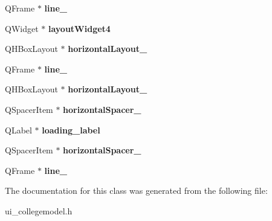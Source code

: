 \begin{DoxyCompactItemize}
Q\+Frame $\ast$ {\bfseries line\+\_}
\item 
\mbox{\label{class_ui___college_model_a1dc907e4b7248cc743c968dc1e61148c}} 
Q\+Widget $\ast$ {\bfseries layout\+Widget4}
\item 
\mbox{\label{class_ui___college_model_adbfb72e4580306a4877230ce3edb7098}} 
Q\+H\+Box\+Layout $\ast$ {\bfseries horizontal\+Layout\+\_}
\item 
\mbox{\label{class_ui___college_model_a3cba7f7dfe5b984ab0a7a38b6884cd55}} 
Q\+Frame $\ast$ {\bfseries line\+\_}
\item 
\mbox{\label{class_ui___college_model_afafb10cd25d6e9f4350677130193512b}} 
Q\+H\+Box\+Layout $\ast$ {\bfseries horizontal\+Layout\+\_}
\item 
\mbox{\label{class_ui___college_model_a4a6598ce1fd4560615ca94872dbc7f3c}} 
Q\+Spacer\+Item $\ast$ {\bfseries horizontal\+Spacer\+\_}
\item 
\mbox{\label{class_ui___college_model_a61047000346207cced67e38e1d94603f}} 
Q\+Label $\ast$ {\bfseries loading\+\_\+label}
\item 
\mbox{\label{class_ui___college_model_afa37370f8db338cac2ee6ca71c3cffdc}} 
Q\+Spacer\+Item $\ast$ {\bfseries horizontal\+Spacer\+\_}
\item 
\mbox{\label{class_ui___college_model_a6e0b9090a33af7a4b3db31a9bcf81a85}} 
Q\+Frame $\ast$ {\bfseries line\+\_}
\end{DoxyCompactItemize}


The documentation for this class was generated from the following file\+:\begin{DoxyCompactItemize}
\item 
ui\+\_\+collegemodel.\+h\end{DoxyCompactItemize}
